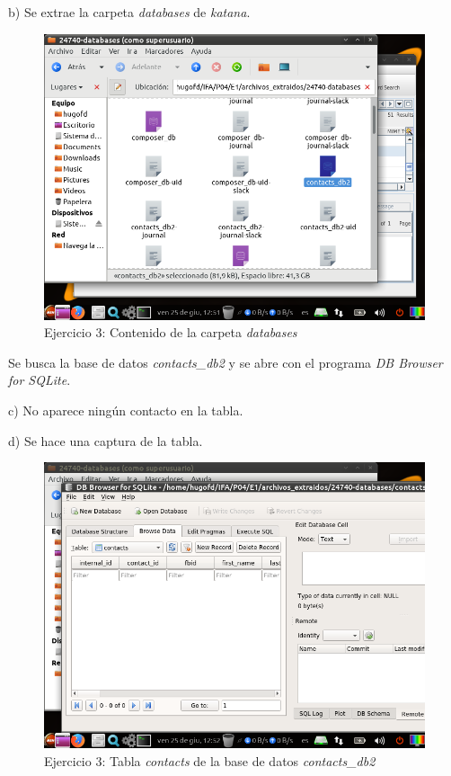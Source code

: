 \documentclass[11pt]{article}
\begin{document}
b) Se extrae la carpeta \textit{databases} de \textit{katana}.

\begin{figure}[H]
    \caption{Ejercicio 3: Contenido de la carpeta \textit{databases}}
    \centering
    \includegraphics[scale=0.7]{e3-2.png}
\end{figure}

Se busca la base de datos \textit{contacts\_db2} y se abre con el programa \textit{DB Browser for SQLite}.

c) No aparece ningún contacto en la tabla.

d) Se hace una captura de la tabla.

\begin{figure}[H]
    \caption{Ejercicio 3: Tabla \textit{contacts} de la base de datos \textit{contacts\_db2}}
    \centering
    \includegraphics[scale=0.7]{e3-3.png}
\end{figure}
\end{document}
